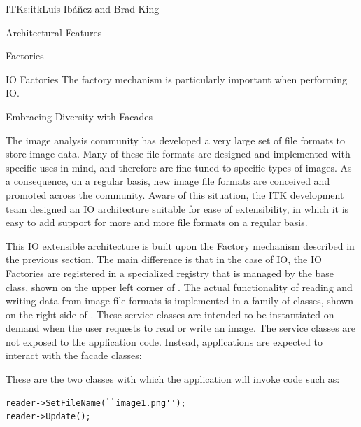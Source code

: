 \begin{aosachapter}{ITK}{s:itk}{Luis Ib\'{a}\~{n}ez and Brad King}
\begin{aosasect1}{Architectural Features}
\begin{aosasect2}{Factories}
\end{aosasect2}

\begin{aosasect2}{IO Factories}
The factory mechanism is particularly important when performing IO.

\begin{aosasect3}{Embracing Diversity with Facades}

The image analysis community has developed a very large set of file formats to
store image data. Many of these file formats are designed and implemented with
specific uses in mind, and therefore are fine-tuned to specific types of
images. As a consequence, on a regular basis, new image file formats are
conceived and promoted across the community. Aware of this situation, the ITK
development team designed an IO architecture suitable for ease of
extensibility, in which it is easy to add support for more and more file
formats on a regular basis.


This IO extensible architecture is built upon the Factory mechanism
described in the previous section. The main difference is that in the case of IO,
the IO Factories are registered in a specialized registry that is managed by
the  base class, shown on the upper left corner of
. The actual functionality of reading
and writing data from image file formats is implemented in a family of
 classes, shown on the right side of
. These service classes are intended
to be instantiated on demand when the user requests to read or write an image.
The service classes are not exposed to the application code. Instead,
applications are expected to interact with the facade classes:

\begin{aosaitemize}
\item {}
\item {}
\end{aosaitemize}

\noindent These are the two classes with which the application will invoke code such as:

\begin{verbatim}
reader->SetFileName(``image1.png'');
reader->Update();
\end{verbatim}


\end{aosasect3}
\end{aosasect2}
\end{aosasect1}
\end{aosachapter}
